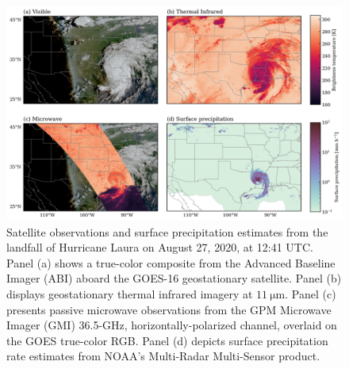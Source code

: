 \documentclass[11pt]{article}
\begin{document}
\begin{figure}[htbp]
	\centering \includegraphics[width=1.0\textwidth]{figures/fig01}
	\caption{Satellite observations and surface precipitation estimates from the
		landfall of Hurricane Laura on August 27, 2020, at 12:41 UTC. Panel (a)
		shows a true-color composite from the Advanced Baseline Imager (ABI) aboard
		the GOES-16 geostationary satellite. Panel (b) displays geostationary
		thermal infrared imagery at $\SI{11}{\micro \meter}$. Panel (c) presents
		passive microwave observations from the GPM Microwave Imager (GMI) 36.5-GHz,
		horizontally-polarized channel, overlaid on the GOES true-color RGB. Panel
		(d) depicts surface precipitation rate estimates from NOAA’s Multi-Radar
		Multi-Sensor product.}
	\label{fig:observations_conus}
\end{figure}
\end{document}

